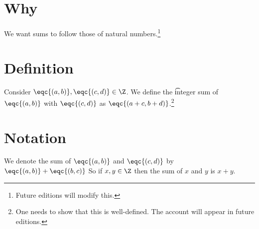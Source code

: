 

\section*{Why}

We want sums to follow those of natural numbers.\footnote{Future editions will modify this.}

\section*{Definition}

Consider $\eqc{(a, b)}, \eqc{(c, d)} \in \Z $.
We define the \t{integer sum} of $\eqc{(a, b)}$ with $\eqc{(c, d)}$ as $\eqc{(a + c, b + d)}$.\footnote{One needs to show that this is well-defined. The account will appear in future editions.}

\section*{Notation}

We denote the sum of $\eqc{(a, b)}$ and $\eqc{(c, d)}$ by $\eqc{(a, b)} + \eqc{(b, c)}$
So if $x, y \in \Z $ then the sum of $x$ and $y$ is $x + y$.

\blankpage